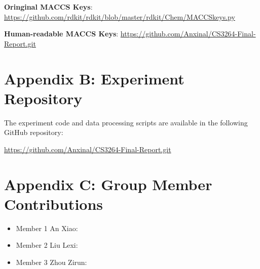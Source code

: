 \documentclass[letterpaper]{article} %
\begin{document}
\textbf{Oringinal MACCS Keys}: \url{https://github.com/rdkit/rdkit/blob/master/rdkit/Chem/MACCSkeys.py}

\textbf{Human-readable MACCS Keys}: \url{https://github.com/Anxinal/CS3264-Final-Report.git}

\section{Appendix B: Experiment Repository}
The experiment code and data processing scripts are available in the following GitHub repository: 

\url{https://github.com/Anxinal/CS3264-Final-Report.git}

\section{Appendix C: Group Member Contributions}
\begin{itemize}
    \item Member 1 An Xiao: 
    \item Member 2 Liu Lexi: 
    \item Member 3 Zhou Zirun: 
\end{itemize}
\end{document}
